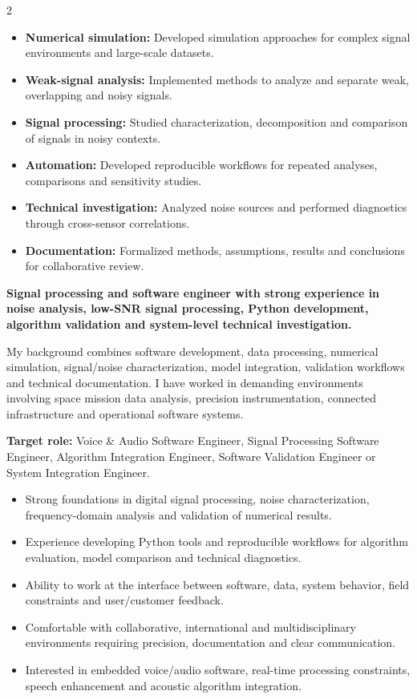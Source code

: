 \documentclass[8pt,a4paper,ragged2e,withhyper]{altacv}
\begin{document}
\begin{paracol}{2}
\begin{itemize}
  \item \textbf{Numerical simulation:} Developed simulation approaches for complex signal environments and large-scale datasets.
  \item \textbf{Weak-signal analysis:} Implemented methods to analyze and separate weak, overlapping and noisy signals.
  \item \textbf{Signal processing:} Studied characterization, decomposition and comparison of signals in noisy contexts.
  \item \textbf{Automation:} Developed reproducible workflows for repeated analyses, comparisons and sensitivity studies.
  \item \textbf{Technical investigation:} Analyzed noise sources and performed diagnostics through cross-sensor correlations.
  \item \textbf{Documentation:} Formalized methods, assumptions, results and conclusions for collaborative review.
\end{itemize}

\switchcolumn


\textbf{Signal processing and software engineer with strong experience in noise analysis, low-SNR signal processing, Python development, algorithm validation and system-level technical investigation.}

My background combines software development, data processing, numerical simulation, signal/noise characterization, model integration, validation workflows and technical documentation. I have worked in demanding environments involving space mission data analysis, precision instrumentation, connected infrastructure and operational software systems.

\medskip

\textbf{Target role:} Voice \& Audio Software Engineer, Signal Processing Software Engineer, Algorithm Integration Engineer, Software Validation Engineer or System Integration Engineer.

\begin{itemize}
  \item Strong foundations in digital signal processing, noise characterization, frequency-domain analysis and validation of numerical results.
  \item Experience developing Python tools and reproducible workflows for algorithm evaluation, model comparison and technical diagnostics.
  \item Ability to work at the interface between software, data, system behavior, field constraints and user/customer feedback.
  \item Comfortable with collaborative, international and multidisciplinary environments requiring precision, documentation and clear communication.
  \item Interested in embedded voice/audio software, real-time processing constraints, speech enhancement and acoustic algorithm integration.
\end{itemize}


\end{paracol}
\end{document}

